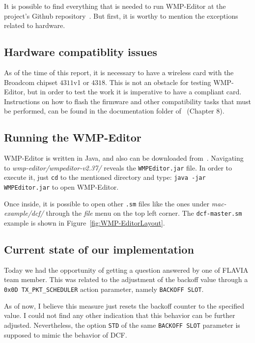 It is possible to find everything that is needed to run WMP-Editor at the project's Github repository~\cite{WMP-code}. But first, it is worthy to mention the exceptions related to hardware.

\subsection{Hardware compatiblity issues}

As of the time of this report, it is necessary to have a wireless card with the Broadcom chipset $4311$v1 or $4318$. This is not an obstacle for testing WMP-Editor, but in order to test the work it is imperative to have a compliant card. Instructions on how to flash the firmware and other compatibility tasks that must be performed, can be found in the documentation folder of~\cite{WMP-code} (Chapter $8$).

\subsection{Running the WMP-Editor}

WMP-Editor is written in Java, and also can be downloaded from~\cite{WMP-code}. Navigating to \emph{wmp-editor/wmpeditor-v2.37/} reveals the \texttt{WMPEditor.jar} file. In order to execute it, just \texttt{cd} to the mentioned directory and type: \texttt{java -jar WMPEditor.jar} to open WMP-Editor.

Once inside, it is possible to open other \texttt{.sm} files like the ones under \emph{mac-example/dcf/} through the \emph{file} menu on the top left corner. The \texttt{dcf-master.sm} example is shown in Figure~\ref{fig:WMP-EditorLayout}.

\subsection{Current state of our implementation}

Today we had the opportunity of getting a question answered by one of FLAVIA team member. This was related to the adjustment of the backoff value through a \texttt{0x0D TX\_PKT\_SCHEDULER} action parameter, namely \texttt{BACKOFF SLOT}.

As of now, I believe this measure just resets the backoff counter to the specified value. I could not find any other indication that this behavior can be further adjusted. Nevertheless, the option \texttt{STD} of the same \texttt{BACKOFF SLOT} parameter is supposed to mimic the behavior of DCF. 

